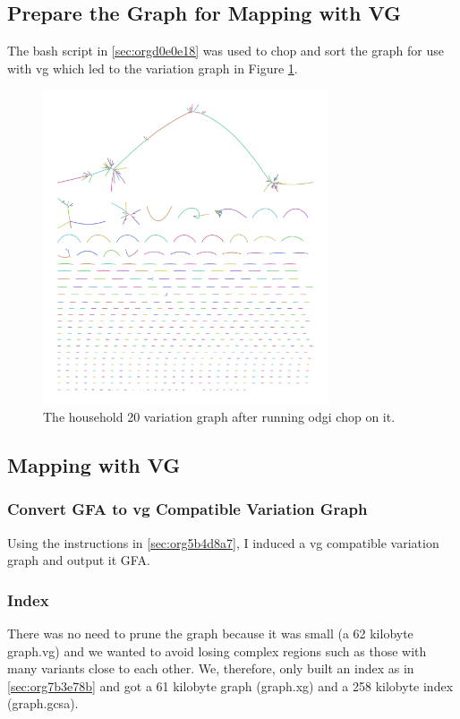 \documentclass[10pt, a4paper]{article}
\begin{document}
\subsection{Prepare the Graph for Mapping with VG}
\label{sec:org2163ba8}
The bash script in \ref{sec:orgd0e0e18} was used to chop and sort the graph
for use with vg \cite{garrisonVariationGraphToolkit2018} which led to the 
variation graph in Figure \ref{fig:org2e1dbcd}.

\begin{figure}
\centering
\includegraphics[width=0.75\textwidth]{../Figures/RSV/Assembly_Bluntified.png}
\caption[RSV Variation Graph]{\label{fig:org2e1dbcd}The household 20 variation graph after running odgi chop on it.}
\end{figure}

\subsection{Mapping with VG}
\label{sec:org8c956da}
\subsubsection{Convert GFA to vg Compatible Variation Graph}
\label{sec:org7f00e1c}
Using the instructions in \ref{sec:org5b4d8a7}, I induced a vg
\cite{garrisonVariationGraphToolkit2018} compatible variation graph and output it
GFA.

\subsubsection{Index}
\label{sec:org170e463}
There was no need to prune the graph because it was small 
(a 62 kilobyte graph.vg) and we wanted to avoid losing complex regions such as 
those with many variants close to each other.
We, therefore, only built an index as in \ref{sec:org7b3e78b} and got a 61
kilobyte graph (graph.xg) and a 258 kilobyte index (graph.gcsa).
\end{document}
